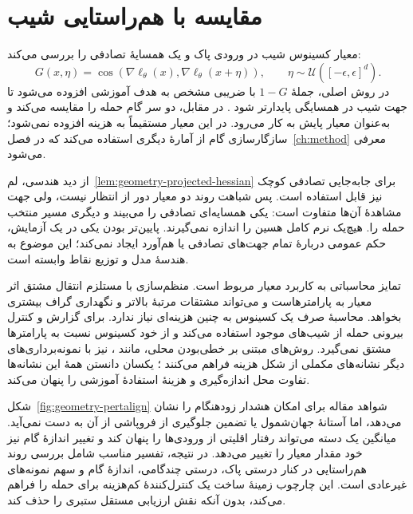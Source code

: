 \section{مقایسه با هم‌راستایی شیب}
\label{sec:geometry-gradalign}

معیار  کسینوس شیب در ورودی پاک و یک همسایهٔ تصادفی را بررسی می‌کند:
\begin{equation}
G(x,\eta)=\cos\!\left(\nabla\ell_\theta(x),\nabla\ell_\theta(x+\eta)\right),
\qquad \eta\sim\mathcal{U}([-\epsilon,\epsilon]^d).
\label{eq:geometry-gradalign}
\end{equation}
در روش اصلی، جملهٔ $1-G$ با ضریبی مشخص به هدف آموزشی افزوده می‌شود تا جهت شیب در همسایگی پایدارتر شود \cite{andriushchenko2020understanding}. در مقابل، \pertalign{} دو سر گام حمله را مقایسه می‌کند و به‌عنوان معیار پایش به کار می‌رود. در \sora{} این معیار مستقیماً به هزینه افزوده نمی‌شود؛ سازگارسازی گام از آمارهٔ دیگری استفاده می‌کند که در فصل~\ref{ch:method} معرفی می‌شود.

از دید هندسی، لم~\ref{lem:geometry-projected-hessian} برای جابه‌جایی تصادفی کوچک نیز قابل استفاده است. پس شباهت روند دو معیار دور از انتظار نیست، ولی جهت مشاهدهٔ آن‌ها متفاوت است: یکی همسایه‌ای تصادفی را می‌بیند و دیگری مسیر منتخب حمله را. هیچ‌یک نرم کامل هسین را اندازه نمی‌گیرند. پایین‌تر بودن یکی در یک آزمایش، حکم عمومی دربارهٔ تمام جهت‌های تصادفی یا هم‌آورد ایجاد نمی‌کند؛ این موضوع به هندسهٔ مدل و توزیع نقاط وابسته است.

تمایز محاسباتی به کاربرد معیار مربوط است. منظم‌سازی با  مستلزم انتقال مشتق اثر معیار به پارامترهاست و می‌تواند مشتقات مرتبهٔ بالاتر و نگهداری گراف بیشتری بخواهد. محاسبهٔ صرف یک کسینوس به چنین هزینه‌ای نیاز ندارد. \pertalign{} برای گزارش و کنترل بیرونی حمله از شیب‌های موجود استفاده می‌کند و از خود کسینوس نسبت به پارامترها مشتق نمی‌گیرد. روش‌های مبتنی بر خطی‌بودن محلی، مانند ، نیز با نمونه‌برداری‌های دیگر نشانه‌های مکملی از شکل هزینه فراهم می‌کنند \cite{rocamora2024efficient}؛ یکسان دانستن همهٔ این نشانه‌ها تفاوت محل اندازه‌گیری و هزینهٔ استفادهٔ آموزشی را پنهان می‌کند.

شکل~\ref{fig:geometry-pertalign} شواهد مقاله برای امکان هشدار زودهنگام را نشان می‌دهد، اما آستانهٔ جهان‌شمول یا تضمین جلوگیری از فروپاشی از آن به دست نمی‌آید. میانگین یک دسته می‌تواند رفتار اقلیتی از ورودی‌ها را پنهان کند و تغییر اندازهٔ گام نیز خود مقدار معیار را تغییر می‌دهد. در نتیجه، تفسیر مناسب شامل بررسی روند هم‌راستایی در کنار درستی پاک، درستی چندگامی، اندازهٔ گام و سهم نمونه‌های غیرعادی است. این چارچوب زمینهٔ ساخت یک کنترل‌کنندهٔ کم‌هزینه برای حمله را فراهم می‌کند، بدون آنکه نقش ارزیابی مستقل ستبری را حذف کند.
